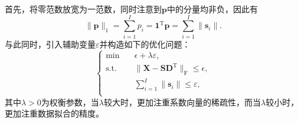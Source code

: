 首先，将零范数放宽为一范数，同时注意到\( \bm{p} \)中的分量均非负，因此有
\[
    \|\bm{p}\|_1 = \sum_{i=1}^I p_i = \bm{1}^{\mathrm{T}} \bm{p} = \sum_{i=1}^I \|\bm{s}_i\|.
\]
与此同时，引入辅助变量\( \varepsilon \)并构造如下的优化问题：
\[
    \begin{cases}
        \min \quad        & \epsilon + \lambda \varepsilon,                                                 \\
        \text{s.t.} \quad & \|\mathbf{X} - \mathbf{S} \mathbf{D}^{\mathrm{T}}\|_{\mathrm{F}} \leq \epsilon, \\
                          & \sum_{i=1}^I \|\bm{s}_i\| \leq \varepsilon,                                     \\
    \end{cases}
\]
其中\( \lambda > 0 \)为权衡参数，当\( \lambda \)较大时，更加注重系数向量的稀疏性，而当\( \lambda \)较小时，更加注重数据拟合的精度。

